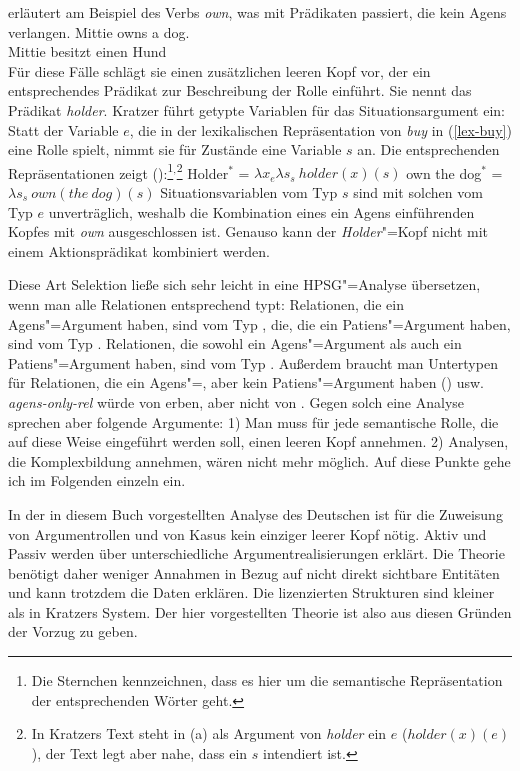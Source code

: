 {\noindent
\citet[]{Kratzer96a} erläutert am Beispiel des Verbs \emph{own}, was mit Prädikaten passiert,
die kein Agens verlangen.
\ea
\gll Mittie owns a dog.\\
     Mittie besitzt einen Hund\\
\z
Für diese Fälle schlägt sie einen zusätzlichen leeren Kopf vor, der ein entsprechendes
Prädikat zur Beschreibung der Rolle einführt. Sie nennt das Prädikat \emph{holder}.
Kratzer führt getypte Variablen für das Situationsargument ein: Statt der Variable
$e$, die in der lexikalischen Repräsentation von \emph{buy} in (\ref{lex-buy}) eine Rolle
spielt, nimmt sie für Zustände eine Variable $s$ an. Die entsprechenden Repräsentationen
zeigt ():\footnote{
  Die Sternchen kennzeichnen, dass es hier um die semantische Repräsentation der entsprechenden
  Wörter geht.}$^,$\footnote{
  In Kratzers Text steht in (a) als Argument von \emph{holder} ein $e$ ($holder(x)(e)$),
  der Text legt aber nahe, dass ein $s$ intendiert ist.%
} 
\eal
\ex Holder$^*$ = $\lambda x_e \lambda s_s~holder(x)(s)$
\ex own the dog$^*$ = $\lambda s_s~own(the~dog)(s)$
\zl
\largerpage
Situationsvariablen vom Typ $s$ sind mit solchen vom Typ $e$ unverträglich, weshalb
die Kombination eines ein Agens einführenden Kopfes mit \emph{own} ausgeschlossen ist.
Genauso kann der \emph{Holder}"=Kopf nicht mit einem Aktionsprädikat kombiniert werden.

Diese Art Selektion ließe sich sehr leicht in eine HPSG"=Analyse übersetzen, wenn man
alle Relationen entsprechend typt: Relationen, die ein Agens"=Argument haben, sind vom Typ
, die, die ein Patiens"=Argument haben, sind vom Typ .
Relationen, die sowohl ein Agens"=Argument als auch ein Patiens"=Argument haben, sind
vom Typ . Außerdem braucht man Untertypen für Relationen, die
ein Agens"=, aber kein Patiens"=Argument haben () usw. \emph{agens-only-rel}
würde von  erben, aber nicht von . Gegen solch eine Analyse
sprechen aber folgende Argumente: 1) Man muss für jede semantische Rolle, die auf diese Weise
eingeführt werden soll, einen leeren Kopf annehmen. 
2) Analysen, die Komplexbildung annehmen, wären nicht mehr möglich. Auf diese Punkte gehe ich im Folgenden einzeln ein. 

In der in diesem Buch vorgestellten Analyse des Deutschen ist für die Zuweisung
von Argumentrollen und von Kasus kein einziger leerer Kopf nötig. Aktiv und Passiv
werden über unterschiedliche Argumentrealisierungen erklärt. Die Theorie benötigt
daher weniger Annahmen in Bezug auf nicht direkt sichtbare Entitäten und kann trotzdem
die Daten erklären. Die lizenzierten Strukturen sind kleiner als in Kratzers System.
Der hier vorgestellten Theorie ist also aus diesen Gründen der Vorzug zu geben.%

}
